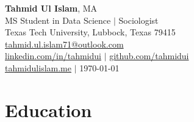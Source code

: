 \documentclass[letterpaper,10pt]{article}
\begin{document}
    \begin{center}
        \textbf{\LARGE Tahmid Ul Islam}, MA \\
        \vspace{0.65em}
        MS Student in Data Science $|$ Sociologist\\
        Texas Tech University,
        Lubbock,
        Texas 79415 \\
        \vspace{0.65em}
        \href{mailto:tahmid.ul.islam71@outlook.com}{tahmid.ul.islam71@outlook.com} \\
        \href{https://linkedin.com/in/tahmidui}{linkedin.com/in/tahmidui} $|$
        \href{https://github.com/tahmidui}{github.com/tahmidui} \\
        \href{https://tahmidulislam.me}{tahmidulislam.me}
        $|$ 
        \MonthYear\today
    \end{center}
    \thispagestyle{empty}


    \section{Education}

    \vspace{0.3em}

    \noindent{}\par
    \noindent{}\par
    \vspace{0.65em}
\end{document}
